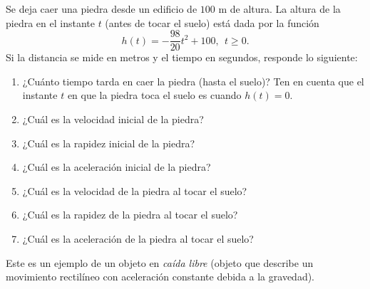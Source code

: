 \documentclass[12pt,a4paper]{book}
\begin{document}
    \begin{ejercicio}\label{ej:254}
        Se deja caer una piedra desde un edificio de
        $100$ m de altura. La altura de la piedra en el instante $t$ (antes de tocar el
        suelo) está dada por la función
        \begin{equation*}
            h(t)=-\frac{98}{20}t^{2}+100,\ \ t\geq 0.
        \end{equation*}
        Si la distancia se mide en metros y el tiempo en segundos, responde lo
        siguiente:
        \begin{enumerate}[nosep]
            \item ¿Cuánto tiempo tarda en caer la piedra (hasta el suelo)? Ten en cuenta
            que el instante $t$ en que la piedra toca el suelo es cuando $h(t)=0$.
            \item ¿Cuál es la velocidad inicial de la piedra?
            \item ¿Cuál es la rapidez inicial de la piedra?
            \item ¿Cuál es la aceleración inicial de la piedra?
            \item ¿Cuál es la velocidad de la piedra al tocar el suelo?
            \item ¿Cuál es la rapidez de la piedra al tocar el suelo?
            \item ¿Cuál es la aceleración de la piedra al tocar el suelo?
        \end{enumerate}
        Este es un ejemplo de un objeto en \textit{caída libre} (objeto que describe un movimiento
        rectilíneo con aceleración constante debida a la gravedad).
    \end{ejercicio}
\end{document}
